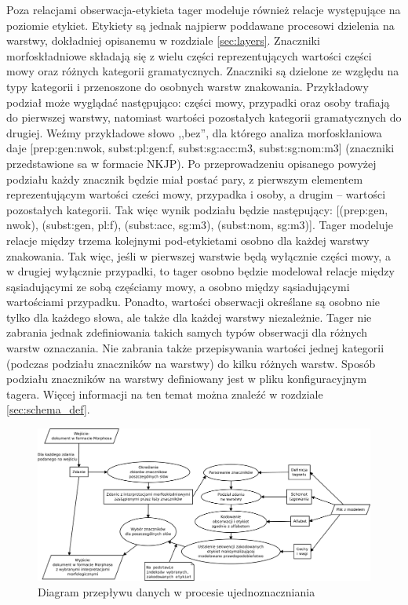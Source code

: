 \documentclass[a4paper,10]{article}
\begin{document}
Poza relacjami obserwacja-etykieta tager modeluje również relacje występujące
na poziomie etykiet. Etykiety są jednak najpierw poddawane procesowi dzielenia
na warstwy, dokładniej opisanemu w rozdziale \ref{sec:layers}.
Znaczniki morfoskładniowe składają się z wielu
części reprezentujących wartości części mowy oraz różnych kategorii gramatycznych.
Znaczniki są dzielone ze względu na typy kategorii i przenoszone do osobnych
warstw znakowania. Przykładowy podział może wyglądać następująco:
części mowy, przypadki oraz osoby trafiają do pierwszej warstwy,
natomiast wartości pozostałych kategorii gramatycznych do drugiej.
Weźmy przykładowe słowo ,,bez'', dla którego analiza morfoskłaniowa daje
[prep:gen:nwok, subst:pl:gen:f, subst:sg:acc:m3, subst:sg:nom:m3]
(znaczniki przedstawione sa w formacie NKJP).
Po przeprowadzeniu opisanego powyżej podziału każdy znacznik będzie miał postać pary,
z pierwszym elementem reprezentującym wartości cześci mowy, przypadka i osoby, a drugim
-- wartości pozostałych kategorii. Tak więc wynik podziału będzie następujący:
[(prep:gen, nwok), (subst:gen, pl:f), (subst:acc, sg:m3), (subst:nom, sg:m3)].
Tager modeluje relacje między trzema kolejnymi pod-etykietami osobno
dla każdej warstwy znakowania. Tak więc, jeśli w pierwszej warstwie będą
wyłącznie części mowy, a w drugiej wyłącznie przypadki, to tager osobno
będzie modelował relacje między sąsiadującymi ze sobą częściamy mowy,
a osobno między sąsiadującymi wartościami przypadku. Ponadto, wartości
obserwacji określane są osobno nie tylko dla każdego słowa, ale także
dla każdej warstwy niezależnie. Tager nie zabrania jednak zdefiniowania
takich samych typów obserwacji dla różnych warstw oznaczania.
Nie zabrania także przepisywania wartości jednej kategorii (podczas podziału
znaczników na warstwy) do kilku różnych warstw.
Sposób podziału znaczników na warstwy definiowany jest w pliku konfiguracyjnym 
tagera. Więcej informacji na ten temat można znaleźć w rozdziale \ref{sec:schema_def}.

\begin{figure}[ht]
\begin{center}
\includegraphics[width=1.0\textwidth]{tag-flow.pdf}
 \caption{Diagram przepływu danych w procesie ujednoznaczniania}\label{rys:tag-flow}
\end{center}
\end{figure}
\end{document}
